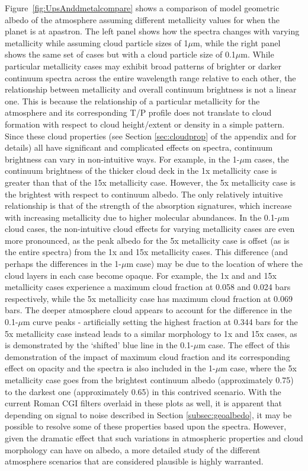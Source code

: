 \documentclass[12pt, letterpaper]{aastex631}
\begin{document}
Figure~\ref{fig:UpsAnddmetalcompare} shows a comparison of model geometric albedo of the atmosphere assuming different metallicity values for when the planet is at apastron. The left panel shows how the spectra changes with varying metallicity while assuming cloud particle sizes of  1\;$\mu$m, while the right panel shows the same set of cases but with a cloud particle size of 0.1\;$\mu$m. While particular metallicity cases may exhibit broad patterns of brighter or darker continuum spectra across the entire wavelength range relative to each other, the relationship between metallicity and overall continuum brightness is not a linear one.  This is because the relationship of a particular metallicity for the atmosphere and its corresponding T/P profile does not translate to cloud formation with respect to cloud height/extent or density in a simple pattern.  Since these cloud properties (see Section \ref{sec:cloudprop} of the appendix and \textcite{2013JQSRT.130..373M, 2017JQSRT.203....3G} for details) all have significant and complicated effects on spectra, continuum brightness can vary in non-intuitive ways.  For example, in the 1-$\mu$m cases, the continuum brightness of the thicker cloud deck in the 1x metallicity case is greater than that of the 15x metallicity case.  However, the 5x metallicity case is the brightest with respect to continuum albedo.  The only relatively intuitive relationship is that of the strength of the absorption signatures, which increase with increasing metallicity due to higher molecular abundances.  In the 0.1-$\mu$m cloud cases, the non-intuitive cloud effects for varying metallicity cases are even more pronounced, as the peak albedo for the 5x metallicity case is offset (as is the entire spectra) from the 1x and 15x metallicity cases. This difference (and perhaps the differences in the 1-$\mu$m case) may be due to the location of where the cloud layers in each case become opaque. For example, the 1x and and 15x metallicity cases experience a maximum cloud fraction at 0.058 and 0.024 bars respectively, while the 5x metallicity case has maximum cloud fraction at 0.069 bars.  The deeper atmosphere cloud appears to account for the difference in the 0.1-$\mu$m curve peaks - artificially setting the highest fraction at 0.344 bars for the 5x metallicity case instead leads to a similar morphology to 1x and 15x cases, as is demonstrated by the `shifted' blue line in the 0.1-$\mu$m case.  The effect of this demonstration of the impact of maximum cloud fraction and its corresponding effect on opacity and the spectra is also included in the 1-$\mu$m case, where the 5x metallicity case goes from the brightest continuum albedo (approximately 0.75) to the darkest one (approximately 0.65) in this contrived scenario.  With the current Roman CGI filters \citep{10.1117/12.2562997} overlaid in these plots as well, it is apparent that depending on signal to noise described in Section \ref{subsec:geoalbedo}, it may be possible to resolve some of these properties based upon the spectra. However, given the dramatic effect that such variations in atmospheric properties and cloud morphology can have on albedo, a more detailed study of the different atmosphere scenarios that are considered plausible is highly warranted. 
\end{document}
